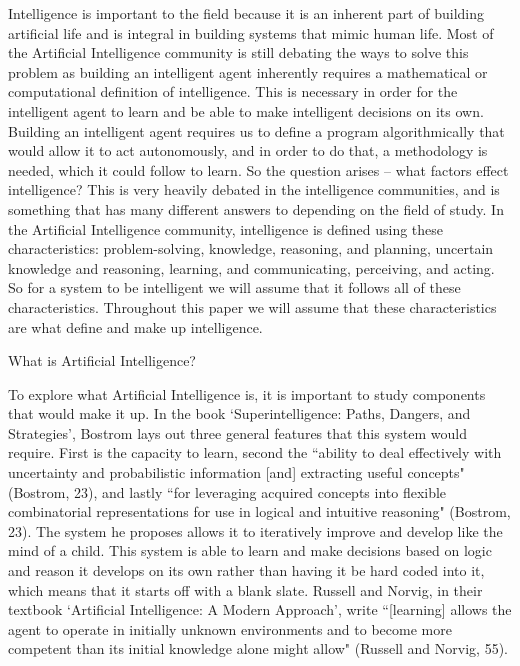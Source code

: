 \documentclass[11pt]{article}
\begin{document}
\par Intelligence is important to the field because it is an inherent part of building artificial life and is integral in building systems that mimic human life. Most of the Artificial Intelligence community is still debating the ways to solve this problem as building an intelligent agent inherently requires a mathematical or computational definition of intelligence. This is necessary in order for the intelligent agent to learn and be able to make intelligent decisions on its own. Building an intelligent agent requires us to define a program algorithmically that would allow it to act autonomously, and in order to do that, a methodology is needed, which it could follow to learn. So the question arises -- what factors effect intelligence? This is very heavily debated in the intelligence communities, and is something that has many different answers to depending on the field of study. In the Artificial Intelligence community, intelligence is defined using these characteristics: problem-solving, knowledge, reasoning, and planning, uncertain knowledge and reasoning, learning, and communicating, perceiving, and acting. So for a system to be intelligent we will assume that it follows all of these characteristics. Throughout this paper we will assume that these characteristics are what define and make up intelligence.

\begin{center}
	{\large What is Artificial Intelligence?\par}
\end{center}
\par To explore what Artificial Intelligence is, it is important to study components that would make it up. In the book `Superintelligence: Paths, Dangers, and Strategies', Bostrom lays out three general features that this system would require. First is the capacity to learn, second the ``ability to deal effectively with uncertainty and probabilistic information [and] extracting useful concepts" (Bostrom, 23), and lastly ``for leveraging acquired concepts into flexible combinatorial representations for use in logical and intuitive reasoning" (Bostrom, 23). The system he proposes allows it to iteratively improve and develop like the mind of a child. This system is able to learn and make decisions based on logic and reason it develops on its own rather than having it be hard coded into it, which means that it starts off with a blank slate. Russell and Norvig, in their textbook `Artificial Intelligence: A Modern Approach', write ``[learning] allows the agent to operate in initially unknown environments and to become more competent than its initial knowledge alone might allow" (Russell and Norvig, 55).
\end{document}
